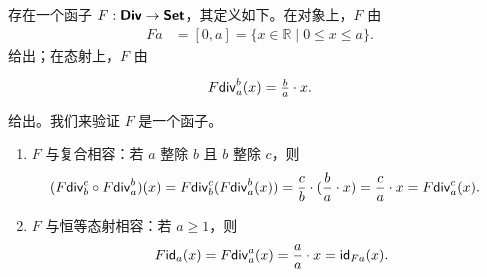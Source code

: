\begin{example}
    存在一个函子 $F:{\boldsymbol{\mathsf{Div}}} \to {\boldsymbol{\mathsf{Set}}}$，其定义如下。在对象上，$F$ 由
    \begin{align*}
    Fa & = [0,a] = \{x \in \mathbb{R} \mid 0 \leq x \leq a\}.
    \end{align*}
    给出；在态射上，$F$ 由
    \[
    \begin{tikzcd}
        F\mathterm{div}_a^b(x) = \frac{b}{a}\cdot x.
    \end{tikzcd}
    \]
    给出。我们来验证 $F$ 是一个函子。
    \begin{enumerate}
        \item $F$ 与复合相容：若 $a$ 整除 $b$ 且 $b$ 整除 $c$，则
        \begin{align*}
        (F \mathsf{div}_b^c \circ F \mathsf{div}_a^b)(x) = F \mathsf{div}_b^c ( F \mathsf{div}_a^b(x)) & = \frac{c}{b}\cdot(\frac{b}{a}\cdot x)  = \frac{c}{a}\cdot x  = F\mathsf{div}_a^c(x).
        \end{align*}
        \item $F$ 与恒等态射相容：若 $a \geq 1$，则
        \begin{align*}
            F\mathsf{id}_a(x) = F \mathsf{div}_a^a(x) = \frac{a}{a} \cdot x = \mathsf{id}_{Fa}(x).
        \end{align*}
    \end{enumerate}
\end{example}
